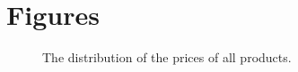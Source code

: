 \chapter{Figures}
\vspace{-5mm}

\begin{figure}[H]
    \centering
    \caption{The distribution of the prices of all products.}
    \label{fig:price_all}
\end{figure}


